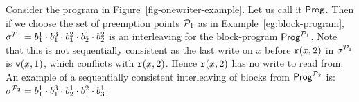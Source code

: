 \begin{example}\label{eg:sc-for-block-programs}
Consider the program in Figure~\ref{fig-onewriter-example}. Let us call it $\mathsf{Prog}$. Then if we choose the set of preemption points $\mathcal{P}_1$ as in Example~\ref{eg:block-program}, $\sigma^{\mathcal{P}_1}=b^1_1\cdot b^3_1 \cdot b_1^2\cdot b_2^1\cdot b_2^2 $ is an interleaving for the block-program $\mathsf{Prog}^{\mathcal{P}_1}$. Note that this is not sequentially consistent as the last write on $x$ before $\mathtt{r}(x,2)$ in $\sigma^{\mathcal{P}_1}$ is $\mathtt{w}(x,1)$, which conflicts with $\mathtt{r}(x,2)$. 
 Hence $\mathtt{r}(x,2)$ has no write to read from.  
An example of a sequentially consistent interleaving of blocks from $\mathsf{Prog}^{\mathcal{P}_2}$ is: $\sigma^{\mathcal{P}_2}=b_1^1\cdot b_1^3\cdot b_2^1\cdot b_1^2\cdot b_3^1$.
\end{example}


